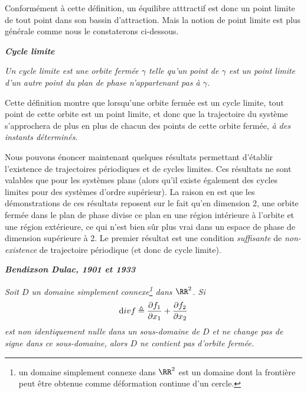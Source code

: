 Conform{é}ment {à} cette d{é}finition, un {é}quilibre atttractif est donc un
point limite de tout point dans son bassin d'attraction. Mais la
notion de point limite est plus g{é}n{é}rale comme nous le
constaterons ci-dessous.

\begin{definition}{\bf \em Cycle limite}

{\em Un {\em cycle limite} est une orbite ferm{é}e $\gamma$ telle qu'un point de $\gamma$ est
un point limite d'un autre point du plan de phase n'appartenant pas
 {à} $\gamma$.}\cqfd\end{definition}
   
Cette d{é}finition montre que lorsqu'une orbite ferm{é}e est un cycle
limite, tout point de cette orbite est un point limite, et donc que la
trajectoire du syst{è}me s'approchera de plus en plus de chacun des
points de cette orbite ferm{é}e, {\em {à} des instants
  d{é}termin{é}s}.

Nous pouvons {é}noncer maintenant quelques r{é}sultats permettant d'{é}tablir l'existence
de trajectoires p{é}riodiques et de cycles limites. Ces r{é}sultats ne sont valables que
pour les syst{è}mes plans (alors qu'il existe également des cycles limites
pour des syst{è}mes d'ordre sup{é}rieur). La raison en est que les d{é}monstrations de ces
r{é}sultats reposent sur le fait qu'en dimension 2, une orbite ferm{é}e dans le plan de
phase divise ce plan en une r{é}gion int{é}rieure {à} l'orbite et une r{é}gion
ext{é}rieure, ce qui n'est bien s{\^u}r plus vrai dans un espace de phase de dimension
sup{é}rieure à 2.
Le premier r{é}sultat est une condition {\em suffisante} de {\em non-existence} de
trajectoire p{é}riodique (et donc de cycle limite).

\begin{theoreme} {\bf \em Bendixson Dulac, 1901 et 1933} 

{\em
Soit $D$ un domaine simplement connexe\footnote{un domaine simplement connexe dans  $\RR^2$ est un
domaine dont la fronti{è}re peut {ê}tre obtenue comme d{é}formation continue d'un cercle.}
dans $\RR^2$.  Si $${\mbox div}f \triangleq \frac{\partial f_1}{\partial
x_1}+\frac{\partial f_2}{\partial x_2}$$ est non identiquement nulle dans un sous-domaine
de $D$ et ne change pas de signe dans ce sous-domaine, alors $D$ ne contient pas d'orbite
ferm{é}e.}\cqfd\end{theoreme}

